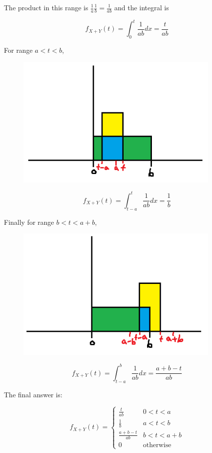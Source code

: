 \documentclass[12pt, a4paper]{article}
\newcounter{exa}
\begin{document}
\begin{texample}
The product in this range is $\frac1a \frac1b = \frac{1}{ab}$ and the integral is

\[f_{X+Y}(t)=\int_0^t \frac{1}{ab} dx = \frac{t}{ab}\]

For range $a<t<b$,

\begin{figure}[H]
\centering
\includegraphics[width=100mm]{26.png}
\end{figure}

\[f_{X+Y}(t)=\int_{t-a}^t \frac{1}{ab} dx = \frac{1}{b}\]

Finally for range $b<t<a+b$,

\begin{figure}[H]
\centering
\includegraphics[width=100mm]{27.png}
\end{figure}

\[f_{X+Y}(t)=\int_{t-a}^b \frac{1}{ab} dx = \frac{a+b-t}{ab}\]

The final answer is:

\[f_{X+Y}(t) = \begin{cases} \frac{t}{ab} & 0 < t < a \\ \frac1b & a < t < b \\ \frac{a+b-t}{ab} & b<t<a+b \\ 0 & \text{otherwise} \end{cases}\]


\end{texample}
\end{document}
